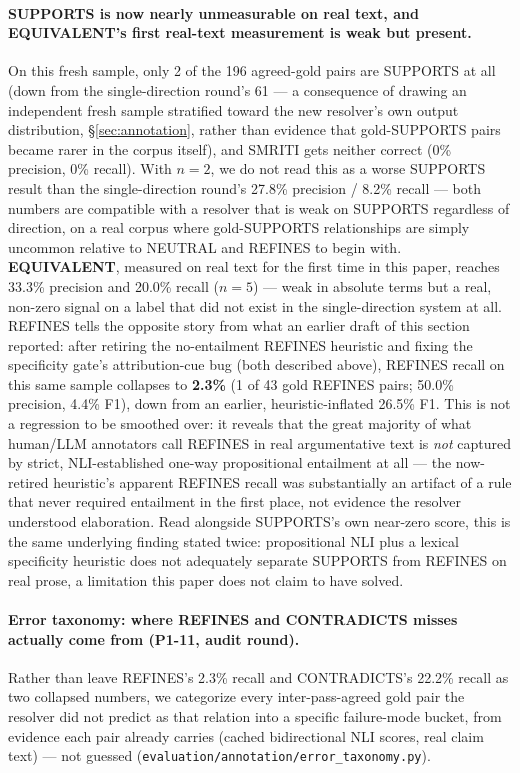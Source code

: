 \paragraph{SUPPORTS is now nearly unmeasurable on real text, and
EQUIVALENT's first real-text measurement is weak but present.} On this
fresh sample, only 2 of the 196 agreed-gold pairs are SUPPORTS at all
(down from the single-direction round's 61 --- a consequence of drawing
an independent fresh sample stratified toward the new resolver's own
output distribution, \S\ref{sec:annotation}, rather than evidence that
gold-SUPPORTS pairs became rarer in the corpus itself), and SMRITI gets
neither correct (0\% precision, 0\% recall). With $n=2$, we do not read
this as a worse SUPPORTS result than the single-direction round's 27.8\%
precision / 8.2\% recall --- both numbers are compatible with a resolver
that is weak on SUPPORTS regardless of direction, on a real corpus where
gold-SUPPORTS relationships are simply uncommon relative to NEUTRAL and
REFINES to begin with. \textbf{EQUIVALENT}, measured on real text for the
first time in this paper, reaches 33.3\% precision and 20.0\% recall
($n=5$) --- weak in absolute terms but a real, non-zero signal on a label
that did not exist in the single-direction system at all. REFINES tells
the opposite story from what an earlier draft of this section reported:
after retiring the no-entailment REFINES heuristic and fixing the
specificity gate's attribution-cue bug (both described above), REFINES
recall on this same sample collapses to \textbf{2.3\%} (1 of 43 gold
REFINES pairs; 50.0\% precision, 4.4\% F1), down from an earlier,
heuristic-inflated 26.5\% F1. This is not a regression to be smoothed
over: it reveals that the great majority of what human/LLM annotators
call REFINES in real argumentative text is \emph{not} captured by strict,
NLI-established one-way propositional entailment at all --- the
now-retired heuristic's apparent REFINES recall was substantially an
artifact of a rule that never required entailment in the first place, not
evidence the resolver understood elaboration. Read alongside SUPPORTS's
own near-zero score, this is the same underlying finding stated twice:
propositional NLI plus a lexical specificity heuristic does not
adequately separate SUPPORTS from REFINES on real prose, a limitation
this paper does not claim to have solved.

\paragraph{Error taxonomy: where REFINES and CONTRADICTS misses actually
come from (P1-11, audit round).} Rather than leave REFINES's 2.3\%
recall and CONTRADICTS's 22.2\% recall as two collapsed numbers, we
categorize every inter-pass-agreed gold pair the resolver did not
predict as that relation into a specific failure-mode bucket, from
evidence each pair already carries (cached bidirectional NLI scores,
real claim text) --- not guessed
(\texttt{evaluation/annotation/error\_taxonomy.py}).

